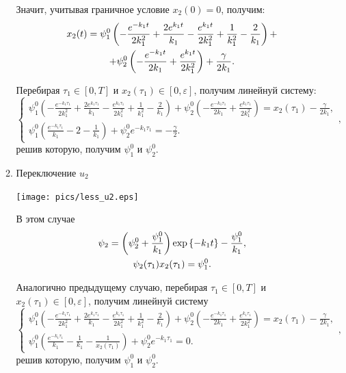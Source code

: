 \documentclass[11pt]{article}
\begin{document}
\begin{enumerate}
\begin{enumerate}
Значит, учитывая граничное условие $x_2(0) = 0$, получим:
\begin{gather}
x_2(t) = \psi_1^0 \left( -\frac{e^{-k_1 t}}{2k_1^2} + \frac{2e^{k_1 t}}{k_1} - \frac{e^{k_1 t}}{2k_1^2} + \frac{1}{k_1^2} - \frac{2}{k_1}\right) + \notag \\
+ \psi_2^0 \left( -\frac{e^{-k_1 t}}{2k_1} + \frac{e^{k_1 t}}{2k_1^2} \right) + \frac{\gamma}{2k_1}. \notag
\end{gather}

Перебирая $\tau_1 \in [0, T]$ и $x_2(\tau_1) \in [0, \varepsilon]$, получим линейнуй систему:
$$
\left\{
\begin{aligned}
\psi_1^0 \left( -\frac{e^{-k_1 \tau_1}}{2k_1^2} + \frac{2e^{k_1 \tau_1}}{k_1} - \frac{e^{k_1 \tau_1}}{2k_1^2} + \frac{1}{k_1^2} - \frac{2}{k_1}\right) + \psi_2^0 \left( -\frac{e^{-k_1 \tau_1}}{2k_1} + \frac{e^{k_1 \tau_1}}{2k_1^2} \right)  = x_2(\tau_1) - \frac{\gamma}{2k_1}, \\
\psi_1^0 \left( \frac{e^{-k_1\tau_1}}{k_1} - 2 - \frac{1}{k_1} \right) + \psi_2^0 e^{-k_1\tau_1} = -\frac{\gamma}{2}.
\end{aligned}
\right.,
$$
решив которую, получим $\psi_1^0$ и $\psi_2^0$.

\item Переключение $u_2$

\texttt{[image: pics/less\_u2.eps]}

В этом случае
\begin{gather}
\psi_2 = \left( \psi_2^0 + \frac{\psi_1^0}{k_1} \right) \exp \left\{ -k_1t \right\} - \frac{\psi_1^0}{k_1}, \notag \\
\psi_2(\tau_1)x_2(\tau_1) = \psi_1^0. \notag
\end{gather}

Аналогично предыдущему случаю, перебирая $\tau_1 \in [0, T]$ и $x_2(\tau_1) \in [0, \varepsilon]$, получим линейнуй систему
$$
\left\{
\begin{aligned}
\psi_1^0 \left( -\frac{e^{-k_1 \tau_1}}{2k_1^2} + \frac{2e^{k_1 \tau_1}}{k_1} - \frac{e^{k_1 \tau_1}}{2k_1^2} + \frac{1}{k_1^2} - \frac{2}{k_1}\right) + \psi_2^0 \left( -\frac{e^{-k_1 \tau_1}}{2k_1} + \frac{e^{k_1 \tau_1}}{2k_1^2} \right)  = x_2(\tau_1) - \frac{\gamma}{2k_1}, \\
\psi_1^0 \left( \frac{e^{-k_1\tau_1}}{k_1} - \frac{1}{k_1} - \frac{1}{x_2(\tau_1)} \right) + \psi_2^0 e^{-k_1\tau_1} = 0.
\end{aligned}
\right.,
$$
решив которую, получим $\psi_1^0$ и $\psi_2^0$.


\end{enumerate}
\end{enumerate}
\end{document}
